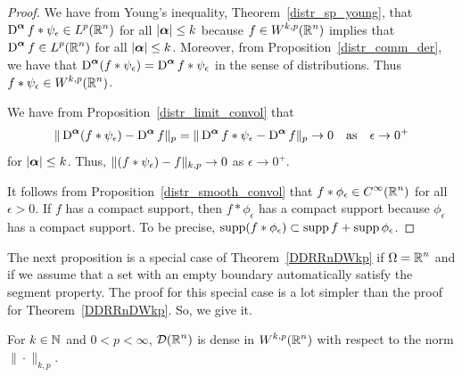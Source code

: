 \begin{proof}
We have from Young's inequality,
Theorem~\ref{distr_sp_young}, that
$\displaystyle \operatorname{D}^{{\bm{\alpha}}} f \ast \psi_\epsilon \in L^p(\mathbb{R}^n)$ for all
$|{\bm{\alpha}}|\leq k$ because $\displaystyle f \in W^{k,p}(\mathbb{R}^n)$ implies that
$\displaystyle \operatorname{D}^{{\bm{\alpha}}} f \in L^p(\mathbb{R}^n)$ for all
$|{\bm{\alpha}}|\leq k$.
Moreover, from Proposition~\ref{distr_comm_der}, we have that
$\displaystyle \operatorname{D}^{{\bm{\alpha}}}(f \ast \psi_\epsilon) = \operatorname{D}^{{\bm{\alpha}}} f
\ast \psi_\epsilon$ in the sense of distributions.  Thus
$\displaystyle f \ast \psi_\epsilon \in W^{k,p}(\mathbb{R}^n)$.

We have from Proposition~\ref{distr_limit_convol} that
\[
\| \operatorname{D}^{{\bm{\alpha}}}(f \ast \psi_\epsilon) - \operatorname{D}^{{\bm{\alpha}}} f \|_{p}
= \| \operatorname{D}^{{\bm{\alpha}}} f \ast \psi_\epsilon - \operatorname{D}^{{\bm{\alpha}}} f \|_{p}
\rightarrow 0 \quad \text{as}\quad \epsilon \rightarrow 0^+
\]
for $|{\bm{\alpha}}|\leq k$.  Thus,
$\displaystyle \| (f \ast \psi_\epsilon) - f \|_{k,p} \rightarrow 0$
as $\epsilon \rightarrow 0^+$.

It follows from Proposition~\ref{distr_smooth_convol} that
$\displaystyle f \ast \phi_{\epsilon} \in C^\infty(\mathbb{R}^n)$ for all $\epsilon>0$.
If $f$ has a compact support, then $f \ast \phi_{\epsilon}$ has a
compact support because $\phi_\epsilon$ has a compact support.  To be
precise,
$\operatorname{supp} (f \ast \phi_{\epsilon}) \subset \operatorname{supp} f + \operatorname{supp} \phi_{\epsilon}$.
\end{proof}

The next proposition is a special case of Theorem~\ref{DDRRnDWkp} if
$\displaystyle \Omega = \mathbb{R}^n$ and if we assume that a set with an
empty boundary automatically satisfy the segment property.  The proof
for this special case is a lot simpler than the proof for
Theorem~\ref{DDRRnDWkp}.  So, we give it.

\begin{prop} \label{DDRRnDWkpV2}
For $k\in \mathbb{N}$ and $0 < p < \infty$, $\displaystyle \mathcal{D}(\mathbb{R}^n)$ is dense in
$\displaystyle W^{k,p}(\mathbb{R}^n)$ with respect to the norm $\|\cdot\|_{k,p}$.
\end{prop}

